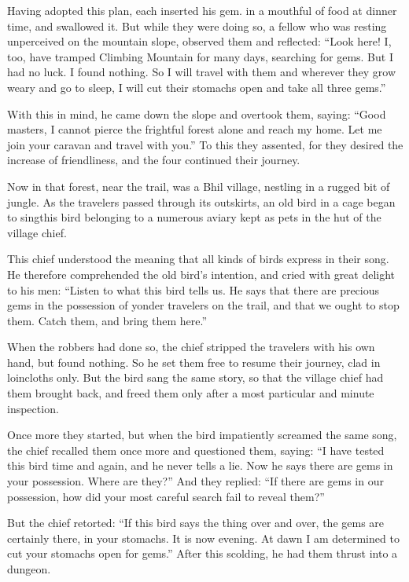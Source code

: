 \documentclass[article, twoside, 14pt]{memoir}
\begin{document}
Having adopted this plan, each inserted his gem. in a mouthful of
food at dinner time, and swallowed it. But while they were doing
so, a fellow who was resting unperceived on the mountain slope,
observed them and reflected:
``Look here! I, too, have tramped Climbing Mountain for many days, searching for gems. But I had no luck. I found nothing. So I will travel with them and wherever they grow weary and go to sleep, I will cut their stomachs open and take all three gems.''

With this in mind, he came down the slope and overtook them,
saying:
``Good masters, I cannot pierce the frightful forest alone and reach my home. Let me join your caravan and travel with you.''
To this they assented, for they desired the increase of
friendliness, and the four continued their journey.

Now in that forest, near the trail, was a Bhil village, nestling in
a rugged bit of jungle. As the travelers passed through its
outskirts, an old bird in a cage began to sing{\textemdash}this bird
belonging to a numerous aviary kept as pets in the hut of the
village chief.

This chief understood the meaning that all kinds of birds express
in their song. He therefore comprehended the old bird's intention,
and cried with great delight to his men:
``Listen to what this bird tells us. He says that there are precious gems in the possession of yonder travelers on the trail, and that we ought to stop them. Catch them, and bring them here.''

When the robbers had done so, the chief stripped the travelers with
his own hand, but found nothing. So he set them free to resume
their journey, clad in loincloths only. But the bird sang the same
story, so that the village chief had them brought back, and freed
them only after a most particular and minute inspection.

Once more they started, but when the bird impatiently screamed the
same song, the chief recalled them once more and questioned them,
saying:
``I have tested this bird time and again, and he never tells a lie. Now he says there are gems in your possession. Where are they?''
And they replied:
``If there are gems in our possession, how did your most careful search fail to reveal them?''

But the chief retorted:
``If this bird says the thing over and over, the gems are certainly there, in your stomachs. It is now evening. At dawn I am determined to cut your stomachs open for gems.''
After this scolding, he had them thrust into a dungeon.
\end{document}
